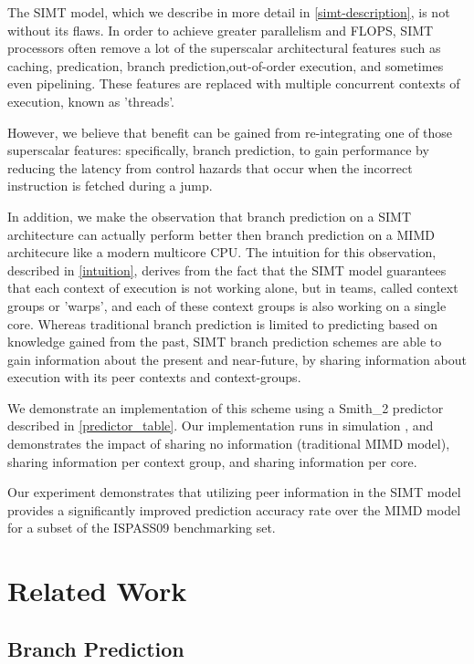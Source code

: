 \documentclass[conference]{IEEEtran}
\begin{document}
The SIMT model, which we describe in more detail in \ref{simt-description}, is not without its flaws.  In order to achieve greater parallelism and 
FLOPS, SIMT processors often remove a lot of the superscalar architectural features such as caching, predication, branch prediction,out-of-order execution, and sometimes even pipelining.
These features are replaced with multiple concurrent contexts of execution, known as 'threads'.

However, we believe that benefit can be gained from re-integrating one of those superscalar features: specifically, branch prediction, to gain 
performance by reducing the latency from control hazards that occur when the incorrect instruction is fetched during a jump.  

In addition, we make the observation that branch prediction on a SIMT architecture can actually perform better then branch prediction on a MIMD architecure like a modern multicore CPU.
The intuition for this observation, described in \ref{intuition}, derives from the fact that the SIMT model guarantees that each context of execution
is not working alone, but in teams, called context groups or 'warps', and each of these context groups is also working on a single core.  Whereas traditional branch prediction
is limited to predicting based on knowledge gained from the past, SIMT branch prediction schemes are able to gain information about the present and near-future, by sharing information
about execution with its peer contexts and context-groups.

We demonstrate an implementation of this scheme using a Smith\_2 predictor \cite{smith} described in \ref{predictor_table}.  Our implementation runs in simulation \cite{ispass09},
and demonstrates the impact of sharing no information (traditional MIMD model), sharing information per context group, and sharing information per core.

Our experiment demonstrates that utilizing peer information in the SIMT model provides a significantly improved prediction accuracy rate over the MIMD model
for a subset of the ISPASS09 \cite{ispass09} benchmarking set.

\section{Related Work}

\subsection{Branch Prediction}
\end{document}
